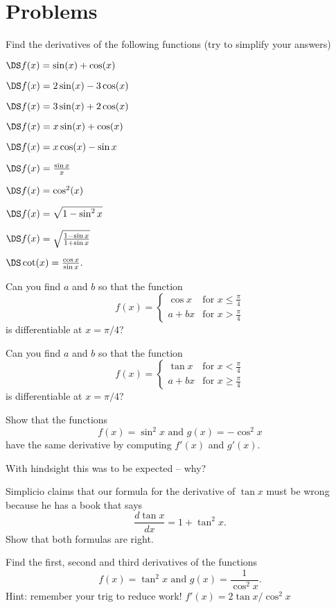 \section{Problems}
\problemfont
\begin{multicols}{2}\setlength{\parindent}{0pt}
\noindent Find the derivatives of the following functions (try to simplify
your answers)

\problem $\DS f(x) = \sin(x) + \cos(x) $

\problem $\DS f(x) = 2\sin(x) - 3\cos(x) $

\problem $\DS f(x) = 3\sin(x) + 2\cos(x) $

\problem $\DS f(x) = x\sin(x) + \cos(x) $

\problem $\DS f(x) = x\cos(x) -\sin x $

\problem $\DS f(x) = \frac{\sin x}{x} $

\problem $\DS f(x) = \cos^2(x) $

\problem $\DS f(x) = \sqrt{1-\sin^2 x} $

\problem $\DS f(x) = \sqrt{\frac{1-\sin x}{1+\sin x}} $

\problem $\DS \cot(x) = \frac{\cos x}{\sin x}.$

\problem Can you find $a$ and $b$ so that the function
\[
f(x) = \begin{cases}
  \cos x & \text{for $x\leq \frac\pi4$} \\
  a+bx   & \text{for $x > \frac\pi4$}
\end{cases}
\]
is differentiable at $x=\pi/4$?


\problem Can you find $a$ and $b$ so that the function
\[
f(x) = \begin{cases}
  \tan x & \text{for $x< \frac\pi4$} \\
  a+bx   & \text{for $x\geq\frac\pi4$}
\end{cases}
\]
is differentiable at $x=\pi/4$?

\problem  Show that the functions
\[
f(x) = \sin^2 x \text{ and } g(x) = -\cos^2x
\]
have the same derivative by computing $f'(x)$ and $g'(x)$.

With hindsight this was to be expected -- why?

\problem Simplicio claims that our formula for the derivative of $\tan x$ must
be wrong because he has a book that says
\[
\frac{d\tan x} {dx} = 1+\tan^2 x.
\]
Show that both formulas are right.

\problem Find the first, second and third derivatives of the functions
\[
f(x) = \tan^2 x \text{ and }
g(x) = \frac{1}{\cos^2 x}.
\]
Hint: remember your trig to reduce work!
\answer
$f'(x) = 2\tan x/\cos^2 x$


\end{multicols}
